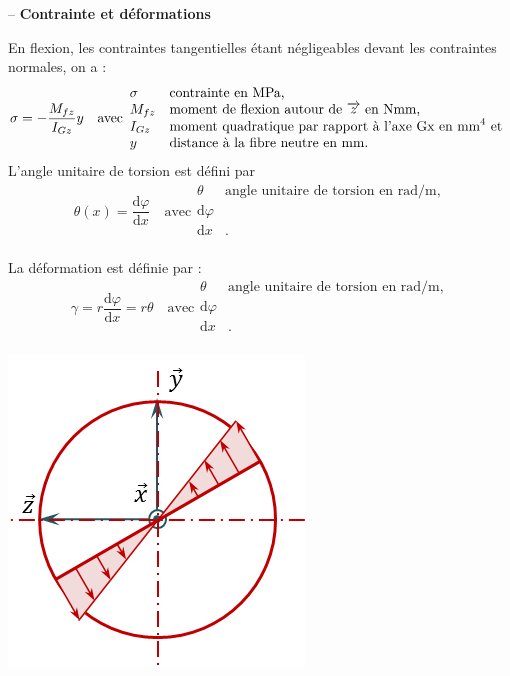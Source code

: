 \documentclass[10pt,fleqn]{article} %
\begin{document}
\begin{defi} -- 
\textbf{Contrainte et déformations} ~\\
\begin{minipage}[c]{.7\linewidth}
En flexion, les contraintes tangentielles étant négligeables devant les contraintes normales, on a : 
$$ \sigma = - \dfrac{M_{fz}}{I_{Gz}}y
\quad 
\text{avec}
\begin{array}{ll}
\sigma &\text{contrainte en \text{MPa},}\\
M_{fz} &\text{moment de flexion autour de $\overrightarrow{z_{}}$ en Nmm,} \\
I_{Gz} &\text{moment quadratique par rapport à l'axe Gx en mm}^4 \text{ et} \\
y &\text{distance à la fibre neutre en mm.}
\end{array}
$$
L'angle unitaire de torsion est défini par 
$$
\theta(x) = \dfrac{\text{d} \varphi}{\text{d} x} 
\quad 
\text{avec}
\begin{array}{ll}
\theta &\text{angle unitaire de torsion en rad/m,}\\
\text{d} \varphi &\text{} \\
\text{d} x &\text{.} \\
\end{array}
$$

La déformation est définie par : 
$$
\gamma = r \dfrac{\text{d} \varphi}{\text{d} x} = r\theta  
\quad 
\text{avec}
\begin{array}{ll}
\theta &\text{angle unitaire de torsion en rad/m,}\\
\text{d} \varphi &\text{} \\
\text{d} x &\text{.} \\
\end{array}
$$
\end{minipage} \hfill
\begin{minipage}[c]{.25\linewidth}
\begin{center}
\includegraphics[width=.9\linewidth]{images/contrainte_torsion}
\end{center}
\end{minipage}
\end{defi}
\end{document}
